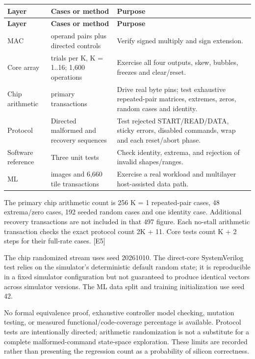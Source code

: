 \documentclass[10pt,letterpaper]{article}
\begin{document}
{\small\begin{longtable}{>{\raggedright\arraybackslash}p{0.169118\dimexpr\linewidth-6\tabcolsep\relax}>{\raggedright\arraybackslash}p{0.375000\dimexpr\linewidth-6\tabcolsep\relax}>{\raggedright\arraybackslash}p{0.455882\dimexpr\linewidth-6\tabcolsep\relax}}\toprule
\textbf{Layer} & \textbf{Cases or method} & \textbf{Purpose}\\\midrule\endfirsthead\textbf{Layer} & \textbf{Cases or method} & \textbf{Purpose}\\\midrule\endhead
MAC & 256 operand pairs plus directed controls & Verify signed multiply and sign extension.\\
Core array & 100 trials per K, K = 1..16; 1,600 operations & Exercise all four outputs, skew, bubbles, freezes and clear/reset.\\
Chip arithmetic & 497 primary transactions & Drive real byte pins; test exhaustive repeated-pair matrices, extremes, zeros, random cases and identity.\\
Protocol & Directed malformed and recovery sequences & Test rejected START/READ/DATA, sticky errors, disabled commands, wrap and each reset/abort phase.\\
Software reference & Three unit tests & Check identity, extrema, and rejection of invalid shapes/ranges.\\
ML & 360 images and 6,660 tile transactions & Exercise a real workload and multilayer host-assisted data path.\\
\bottomrule\end{longtable}}
The primary chip arithmetic count is 256 K = 1 repeated-pair cases, 48 extrema/zero cases, 192 seeded random cases and one identity case. Additional recovery transactions are not included in that 497 figure. Each no-stall arithmetic transaction checks the exact protocol count 2K + 11. Core tests count K + 2 steps for their full-rate cases. [E5]

The chip randomized stream uses seed 20261010. The direct-core SystemVerilog test relies on the simulator's deterministic default random state; it is reproducible in a fixed simulator configuration but not guaranteed to produce identical vectors across simulator versions. The ML data split and training initialization use seed 42.

No formal equivalence proof, exhaustive controller model checking, mutation testing, or measured functional/code-coverage percentage is available. Protocol tests are intentionally directed; arithmetic randomization is not a substitute for a complete malformed-command state-space exploration. These limits are recorded rather than presenting the regression count as a probability of silicon correctness.
\end{document}
